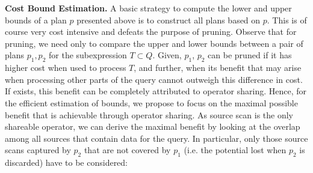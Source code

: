 
\textbf{Cost Bound Estimation.} 
A basic strategy to compute the lower and upper
bounds of a plan $p$ presented above is to construct all plans based on
$p$. This is of course very cost intensive and defeats the purpose of pruning. Observe that for pruning, we need only to compare the upper and lower bounds between a pair of plans $p_1,p_2$ for the subexpression $T \subset Q$. Given, $p_1$, $p_2$ can be pruned if it has higher cost when used to process $T$, and further, when its benefit that may arise when processing other parts of the query cannot outweigh this difference in cost. If exists, this benefit can be completely attributed to operator sharing. Hence, for the efficient estimation of bounds, we propose to focus on the maximal possible benefit that is achievable through operator sharing. As source scan is the only shareable operator, we can derive the maximal benefit by looking at the overlap among all sources that contain data for the query. In particular, only those source scans captured by $p_2$ that are not covered by $p_1$ (i.e. the potential lost when $p_2$ is discarded) have to be considered: 

%

  
